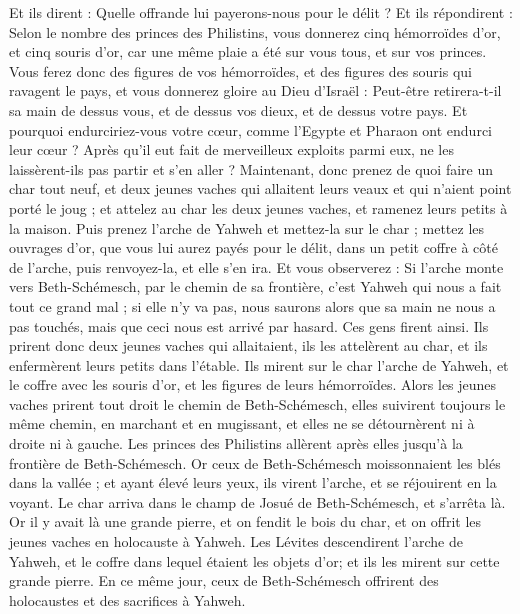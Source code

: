 \begin{multicols}{2}
Et ils dirent : Quelle offrande lui payerons-nous pour le délit ? Et ils répondirent : Selon le nombre des princes des Philistins, vous donnerez cinq hémorroïdes d'or, et cinq souris d'or, car une même plaie a été sur vous tous, et sur vos princes.
Vous ferez donc des figures de vos hémorroïdes, et des figures des souris qui ravagent le pays, et vous donnerez gloire au Dieu d'Israël : Peut-être retirera-t-il sa main de dessus vous, et de dessus vos dieux, et de dessus votre pays.
Et pourquoi endurciriez-vous votre cœur, comme l'Egypte et Pharaon ont endurci leur cœur ? Après qu'il eut fait de merveilleux exploits parmi eux, ne les laissèrent-ils pas partir et s'en aller ?
Maintenant, donc prenez de quoi faire un char tout neuf, et deux jeunes vaches qui allaitent leurs veaux et qui n'aient point porté le joug ; et attelez au char les deux jeunes vaches, et ramenez leurs petits à la maison.
Puis prenez l'arche de Yahweh et mettez-la sur le char ; mettez les ouvrages d'or, que vous lui aurez payés pour le délit, dans un petit coffre à côté de l'arche, puis renvoyez-la, et elle s'en ira.
Et vous observerez : Si l'arche monte vers Beth-Schémesch, par le chemin de sa frontière, c'est Yahweh qui nous a fait tout ce grand mal ; si elle n'y va pas, nous saurons alors que sa main ne nous a pas touchés, mais que ceci nous est arrivé par hasard.
Ces gens firent ainsi. Ils prirent donc deux jeunes vaches qui allaitaient, ils les attelèrent au char, et ils enfermèrent leurs petits dans l'étable.
Ils mirent sur le char l'arche de Yahweh, et le coffre avec les souris d'or, et les figures de leurs hémorroïdes.
Alors les jeunes vaches prirent tout droit le chemin de Beth-Schémesch, elles suivirent toujours le même chemin, en marchant et en mugissant, et elles ne se détournèrent ni à droite ni à gauche. Les princes des Philistins allèrent après elles jusqu'à la frontière de Beth-Schémesch.
Or ceux de Beth-Schémesch moissonnaient les blés dans la vallée ; et ayant élevé leurs yeux, ils virent l'arche, et se réjouirent en la voyant.
Le char arriva dans le champ de Josué de Beth-Schémesch, et s'arrêta là. Or il y avait là une grande pierre, et on fendit le bois du char, et on offrit les jeunes vaches en holocauste à Yahweh.
Les Lévites descendirent l'arche de Yahweh, et le coffre dans lequel étaient les objets d'or; et ils les mirent sur cette grande pierre. En ce même jour, ceux de Beth-Schémesch offrirent des holocaustes et des sacrifices à Yahweh.

\end{multicols}
